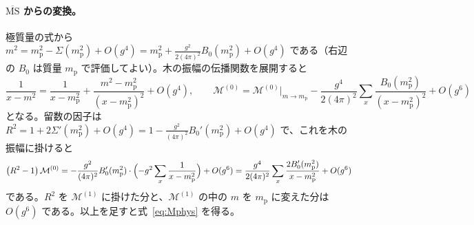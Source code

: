 \documentclass[a4paper,10pt]{ltjsarticle}
\begin{document}
\paragraph{$\overline{\mathrm{MS}}$ からの変換。}極質量の式から $m^2=m_{\mathrm p}^2-\Sigma(m_{\mathrm p}^2)+O(g^4)=m_{\mathrm p}^2+\frac{g^2}{2(4\pi)^2}B_0(m_{\mathrm p}^2)+O(g^4)$ である（右辺の $B_0$ は質量 $m_{\mathrm p}$ で評価してよい）。木の振幅の伝播関数を展開すると
\begin{equation*}
\frac{1}{x-m^2}=\frac{1}{x-m_{\mathrm p}^2}+\frac{m^2-m_{\mathrm p}^2}{(x-m_{\mathrm p}^2)^2}+O(g^4),\qquad
\mathcal{M}^{(0)}=\mathcal{M}^{(0)}\big|_{m\to m_{\mathrm p}}-\frac{g^4}{2(4\pi)^2}\sum_x\frac{B_0(m_{\mathrm p}^2)}{(x-m_{\mathrm p}^2)^2}+O(g^6)
\end{equation*}
となる。留数の因子は $R^2=1+2\Sigma'(m_{\mathrm p}^2)+O(g^4)=1-\frac{g^2}{(4\pi)^2}B_0'(m_{\mathrm p}^2)+O(g^4)$ で、これを木の振幅に掛けると
\begin{equation*}
\bigl(R^2-1\bigr)\,\mathcal{M}^{(0)}=-\frac{g^2}{(4\pi)^2}B_0'(m_{\mathrm p}^2)\cdot\Bigl(-g^2\sum_x\frac{1}{x-m_{\mathrm p}^2}\Bigr)+O(g^6)=\frac{g^4}{2(4\pi)^2}\sum_x\frac{2B_0'(m_{\mathrm p}^2)}{x-m_{\mathrm p}^2}+O(g^6)
\end{equation*}
である。$R^2$ を $\mathcal{M}^{(1)}$ に掛けた分と、$\mathcal{M}^{(1)}$ の中の $m$ を $m_{\mathrm p}$ に変えた分は $O(g^6)$ である。以上を足すと式~\eqref{eq:Mphys} を得る。
\end{document}
